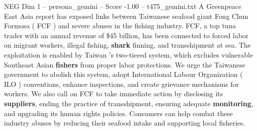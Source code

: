 \begin{textsample}{NEG Dim 1 – persona\_gemini – Score -1.00 – t475\_gemini.txt}  \label{ex:f1_neg_013}
A Greenpeace East Asia report has exposed links between Taiwanese seafood giant Fong Chun Formosa ( FCF ) and severe abuses in the fishing industry.
FCF, a top tuna trader with an annual revenue of \$45 billion, has been connected to forced labor on migrant workers, illegal fishing, \textbf{shark} finning, and transshipment at sea.
The exploitation is enabled by Taiwan 's two-tiered system, which excludes vulnerable Southeast Asian \textbf{fishers} from proper labor protections.
We urge the Taiwanese government to abolish this system, adopt International Labour Organization ( ILO ) conventions, enhance inspections, and create grievance mechanisms for workers.
We also call on FCF to take immediate action by disclosing its \textbf{suppliers}, ending the practice of transshipment, ensuring adequate \textbf{monitoring}, and upgrading its human rights policies.
Consumers can help combat these industry abuses by reducing their seafood intake and supporting local fisheries.

\end{textsample}
